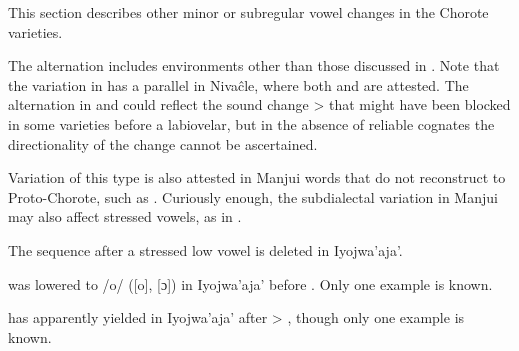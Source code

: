 This section describes other minor or subregular vowel changes in the Chorote varieties.

The alternation  includes environments other than those discussed in . Note that the variation in  has a parallel in Nivaĉle, where both  and  are attested. The alternation in  and  could reflect the sound change  >  that might have been blocked in some varieties before a labiovelar, but in the absence of reliable cognates the directionality of the change cannot be ascertained.

\begin{exe}
 \ex {}
 \ex {}\label{oa-tewok}
 \ex {}\label{oa-punch}
    \ex {}\label{oa-colaptes}
 \end{exe}

Variation of this type is also attested in Manjui words that do not reconstruct to Proto-Chorote, such as . Curiously enough, the subdialectal variation in Manjui may also affect stressed vowels, as in .

The sequence  after a stressed low vowel is deleted in Iyojwa’aja’.

\begin{exe}
    \ex {}
\end{exe}

 was lowered to /o/ ([o], [ɔ]) in Iyojwa’aja’ before . Only one example is known.

\begin{exe}
    \ex {}
\end{exe}

 has apparently yielded  in Iyojwa’aja’ after  > , though only one example is known.

\begin{exe}
    \ex {}\label{ch-e-o-yokwes}
\end{exe}

